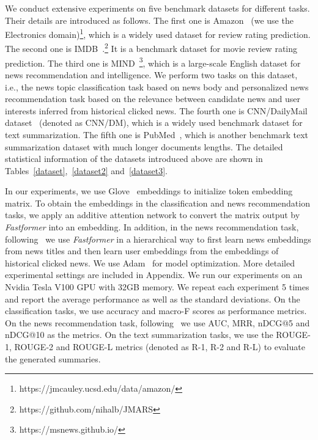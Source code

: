 \documentclass[11pt,a4paper]{article}
\begin{document}
We conduct extensive experiments on five benchmark datasets for different tasks.
Their details are introduced as follows.
The first one is Amazon~\cite{he2016ups} (we use the Electronics domain)\footnote{https://jmcauley.ucsd.edu/data/amazon/}, which is a widely used dataset for review rating prediction.
The second one is IMDB~\cite{diao2014jointly}.\footnote{https://github.com/nihalb/JMARS}
It is a benchmark dataset for movie review rating prediction.
The third one is MIND~\cite{wu2020mind}\footnote{https://msnews.github.io/}, which is a large-scale English dataset for news recommendation and intelligence.
We perform two tasks on this dataset, i.e., the news topic classification task based on news body and personalized news recommendation task based on the relevance between candidate news and user interests inferred from historical clicked news.
The fourth one is CNN/DailyMail dataset~\cite{hermann2015teaching} (denoted as CNN/DM), which is a widely used benchmark dataset for text summarization. 
The fifth one is PubMed~\cite{cohan2018discourse}, which is another benchmark text summarization dataset with much longer documents lengths.
The detailed statistical information of the datasets introduced above are shown in Tables~\ref{dataset},~\ref{dataset2} and~\ref{dataset3}.



In our experiments, we use Glove~\cite{pennington2014glove} embeddings to initialize token embedding matrix.
To obtain the embeddings in the classification and news recommendation tasks, we apply an additive attention network to convert the matrix output by \textit{Fastformer} into an embedding.
In addition, in the news recommendation task, following~\cite{wu2019nrms} we use \textit{Fastformer} in a hierarchical way to first learn news embeddings from news titles and then learn user embeddings from the embeddings of historical clicked news.
We use Adam~\cite{kingma2014adam} for model optimization.
More detailed experimental settings are included in Appendix.
We run our experiments on an Nvidia Tesla V100 GPU with 32GB memory.
We repeat each experiment 5 times and report the average performance as well as the standard deviations.
On the classification tasks, we use accuracy and macro-F scores as performance metrics.
On the news recommendation task, following~\cite{wu2020mind} we use AUC, MRR, nDCG@5 and nDCG@10 as the metrics.
On the text summarization tasks, we use the ROUGE-1, ROUGE-2 and ROUGE-L metrics (denoted as R-1, R-2 and R-L) to evaluate the generated summaries.
\end{document}
